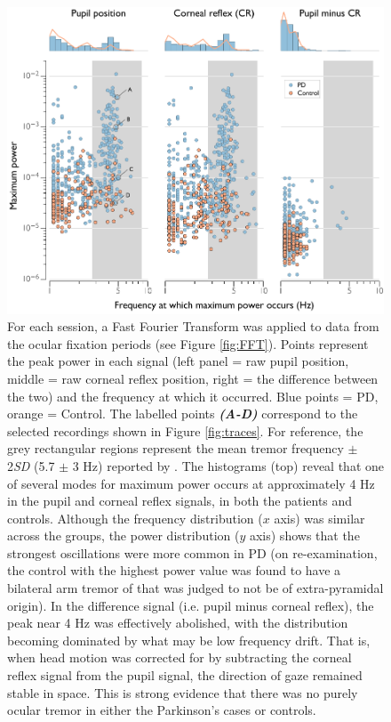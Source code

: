 \documentclass[jou,a4paper]{apa6}
\begin{document}
\begin{figure}[htbp]
\begin{center}
\includegraphics {Figures/Figure_4_Main_frequency_data}
\caption{For each session, a Fast Fourier Transform was applied to data from the ocular fixation periods (see Figure \ref{fig:FFT}). Points represent the peak power in each signal (left panel = raw pupil position, middle = raw corneal reflex position, right = the difference between the two) and the frequency at which it occurred. Blue points = PD, orange = Control. The labelled points \textbf{\textit{(A-D)}} correspond to the selected recordings shown in Figure \ref{fig:traces}. For reference, the grey rectangular regions represent the mean tremor frequency $\pm$ 2\textit{SD} (5.7 $\pm$ 3 Hz) reported by \cite{Gitchel2012Pervasive-ocula}. The histograms (top) reveal that one of several modes for maximum power occurs at approximately 4 Hz in the pupil and corneal reflex signals, in both the patients and controls. Although the frequency distribution ($x$ axis) was similar across the groups, the power distribution ($y$ axis) shows that the strongest oscillations were more common in PD (on re-examination, the control with the highest power value was found to have a bilateral arm tremor of that was judged to not be of extra-pyramidal origin). In the difference signal (i.e. pupil minus corneal reflex), the peak near 4 Hz was effectively abolished, with the distribution becoming dominated by what may be low frequency drift. That is, when head motion was corrected for by subtracting the corneal reflex signal from the pupil signal, the direction of gaze remained stable in space. This is strong evidence that there was no purely ocular tremor in either the Parkinson's cases or controls.}
\label{fig:main}
\end{center}
\end{figure}
\end{document}
